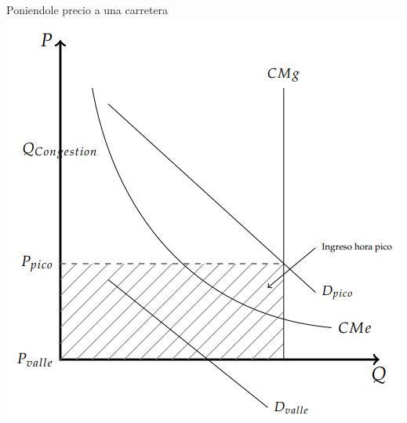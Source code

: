 \documentclass{beamer}
\begin{document}
\begin{frame}{Poniendole precio a una carretera}
    \centering
    \includegraphics[scale=0.7]{../Figures/C24.14.png}
\end{frame}
\end{document}
